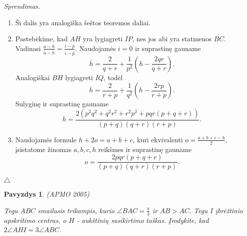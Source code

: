 \documentclass[11pt,a4paper,twoside]{book}
\newenvironment{sprendimas}{\noindent \textit{Sprendimas.}}{\hfill $\triangle$}
\newcounter{foo}[subsection]
\newtheorem{pavnr}[foo]{Pavyzdys}
\theoremstyle{definition} \newtheorem*{api}{Apibrėžimas}
\theoremstyle{remark} \newtheorem*{pastaba}{Pastaba}
\begin{document}
\begin{sprendimas}
\begin{enumerate}
\item Ši dalis yra analogiška šeštos teoremos daliai.
\item Pastebėkime, kad $AH$ yra lygiagreti $IP$, nes jos abi yra statmenos $BC$. Vadinasi $\frac{a-h}{\overline a-\overline h}=\frac{i-p}{\overline i-\overline p}.$ Naudojamės $i=0$ ir suprastinę gauname $$\overline {h}= \frac{2}{q+r} + \frac{1}{p^2}(h-\frac{2qr}{q+r}).$$ Analogiškai $BH$ lygiagreti $IQ$, todėl $$\overline {h}= \frac{2}{r+p} + \frac{1}{q^2}(h-\frac{2rp}{r+p}).$$
Sulyginę ir suprastinę gauname $$h=\frac{2(p^2q^2 + q^2r^2 + r^2p^2 + pqr(p + q+ r))}{(p+q)(q+r)(r+p)}.$$
\item Naudojamės formule $h+2o=a+b+c$, kuri ekvivalenti $o=\frac{a+b+c-h}{2},$ įsistatome žinomas $a, b, c, h$ reikšmes ir suprastinę gauname
$$o=\frac{2pqr(p+q+r)}{(p+q)(q+r)(r+p)}.$$
\end{enumerate}
\end{sprendimas}






\begin{pavnr}
(APMO 2005)

Tegu $ABC$ smailusis trikampis, kurio $\angle BAC = \frac{\pi}{3}$ ir $AB>AC$. Tegu $I$ įbrėžtinio apskritimo centras, o $H$ - aukštinių susikirtimo taškas. Įrodykite, kad $2\angle AHI=3\angle ABC$.
\end{pavnr}
\end{document}
